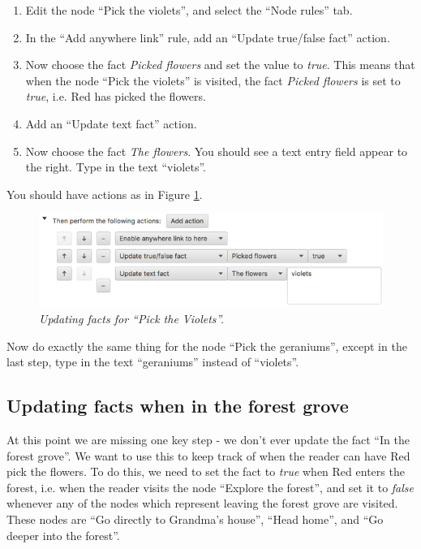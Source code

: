 \documentclass{article}
\begin{document}
\begin{enumerate}
  \item Edit the node ``Pick the violets'', and select the ``Node rules'' tab.
  \item In the ``Add anywhere link'' rule, add an ``Update true/false fact'' action.
  \item Now choose the fact \textit{Picked flowers} and set the value to \textit{true}. 
  This means that when the node ``Pick the violets'' is visited, the fact \textit{Picked flowers} is set to \textit{true}, i.e. Red has picked the flowers.
  \item Add an ``Update text fact'' action.
  \item Now choose the fact \textit{The flowers}. You should see a text entry field appear to the right. Type in the text ``violets''.
\end{enumerate}

You should have actions as in Figure \ref{fig:tut3:picktheviolets2}.

\begin{figure}[h]
  \centering
  \includegraphics[width=12cm]{images/hypedyn-tutorial-3-figure-11}
  \caption{\textit{Updating facts for ``Pick the Violets''.}}
  \label{fig:tut3:picktheviolets2}
\end{figure}

Now do exactly the same thing for the node ``Pick the geraniums'', except in the last step, type in the text ``geraniums'' instead of ``violets''.

\subsection{Updating facts when in the forest grove}

At this point we are missing one key step - we don't ever update the fact ``In the forest grove''. We want to use this to keep track of when the reader can have Red pick the flowers. To do this, we need to set the fact to \textit{true} when Red enters the forest, i.e. when the reader visits the node ``Explore the forest'', and set it to \textit{false} whenever any of the nodes which represent leaving the forest grove are visited. These nodes are ``Go directly to Grandma's house'', ``Head home'', and ``Go deeper into the forest''.
\end{document}

